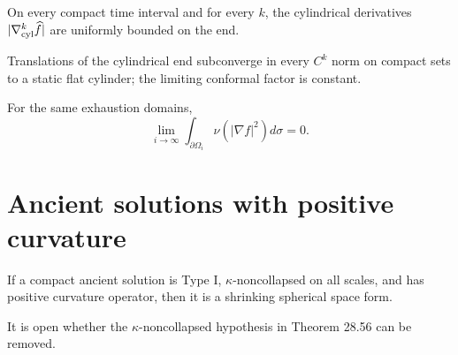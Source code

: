 \begin{lemma}[Higher derivative bounds for \(\widehat f=-\log\widehat u\)]
\label{lem:chow-iv-conformal-factor-derivatives}
On every compact time interval and for every \(k\), the cylindrical derivatives
\(|\nabla^k_{\rm cyl}\widehat f|\) are uniformly bounded on the end.
\end{lemma}

\begin{lemma}
\label{lem:chow-iv-pointwise-flat-cylinder}
Translations of the cylindrical end subconverge in every \(C^k\) norm on
compact sets to a static flat cylinder; the limiting conformal factor is constant.
\end{lemma}

\begin{lemma}
\label{lem:chow-iv-second-boundary-term}
For the same exhaustion domains,
\[
\lim_{i\to\infty}\int_{\partial\Omega_i}\nu(|\nabla f|^2)d\sigma=0.
\]
\end{lemma}

\section{Ancient solutions with positive curvature}

\begin{theorem}
\label{thm:chow-iv-type-i-pco}
If a compact ancient solution is Type I, \(\kappa\)-noncollapsed on all
scales, and has positive curvature operator, then it is a shrinking spherical
space form.
\end{theorem}

\begin{remark}
\label{rem:chow-iv-remove-kappa-condition}
It is open whether the \(\kappa\)-noncollapsed hypothesis in Theorem 28.56
can be removed.
\end{remark}

